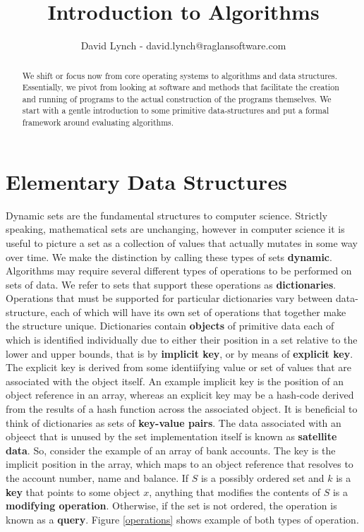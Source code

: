 \documentclass[10pt,a4paper]{article}
\title{Introduction to Algorithms}
\author{David Lynch - david.lynch@raglansoftware.com }
\begin{document}
\maketitle
\begin{abstract}
We shift or focus now from core operating systems to algorithms and data structures. Essentially, we pivot from looking at software and methods that facilitate the creation and running of programs to the actual construction of the programs themselves. We start with a gentle introduction to some primitive data-structures and put a formal framework around evaluating algorithms.
\end{abstract}
\section{Elementary Data Structures}
Dynamic sets are the fundamental structures to computer science. Strictly speaking, mathematical sets are unchanging, however in computer science it is useful to picture a set as a collection of values that actually mutates in some way over time. We make the distinction by calling these types of sets {\bf dynamic}. Algorithms may require several different types of operations to be performed on sets of data. We refer to sets that support these operations as {\bf dictionaries}. Operations that must be supported for particular dictionaries vary between data-structure, each of which will have its own set of operations that together make the structure unique. Dictionaries contain {\bf objects} of primitive data each of which is identified individually due to either their position in a set relative to the lower and upper bounds, that is by {\bf implicit key}, or by means of {\bf explicit key}. The explicit key is derived from some identiifying value or set of values that are associated with the object itself. An example implicit key is the position of an object reference in an array, whereas an explicit key may be a hash-code derived from the results of a hash function across the associated object. It is beneficial to think of dictionaries as sets of {\bf key-value pairs}. The data associated with an objeect that is unused by the set implementation itself is known as {\bf satellite data}. So, consider the example of an array of bank accounts. The key is the implicit position in the array, which maps to an object reference that resolves to the account number, name and balance. 
\newline\newline
If $S$ is a possibly ordered set and $k$ is a {\bf key} that points to some object $x$, anything that modifies the contents of $S$ is a {\bf modifying operation}. Otherwise, if the set is not ordered, the operation is known as a {\bf query}. Figure \ref{operations} shows example of both types of operation.
\end{document}
